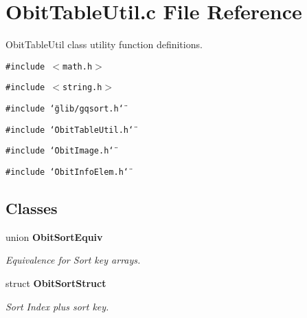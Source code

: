 \section{Obit\-Table\-Util.c File Reference}
\label{ObitTableUtil_8c}
Obit\-Table\-Util class utility function definitions. 

{\tt \#include $<$math.h$>$}\par
{\tt \#include $<$string.h$>$}\par
{\tt \#include \char`\"{}glib/gqsort.h\char`\"{}}\par
{\tt \#include \char`\"{}Obit\-Table\-Util.h\char`\"{}}\par
{\tt \#include \char`\"{}Obit\-Image.h\char`\"{}}\par
{\tt \#include \char`\"{}Obit\-Info\-Elem.h\char`\"{}}\par
\subsection*{Classes}
\begin{CompactItemize}
\item 
union {\bf Obit\-Sort\-Equiv}
\begin{CompactList}\small\item\em Equivalence for Sort key arrays. \item\end{CompactList}\item 
struct {\bf Obit\-Sort\-Struct}
\begin{CompactList}\small\item\em Sort Index plus sort key. \item\end{CompactList}\end{CompactItemize}
